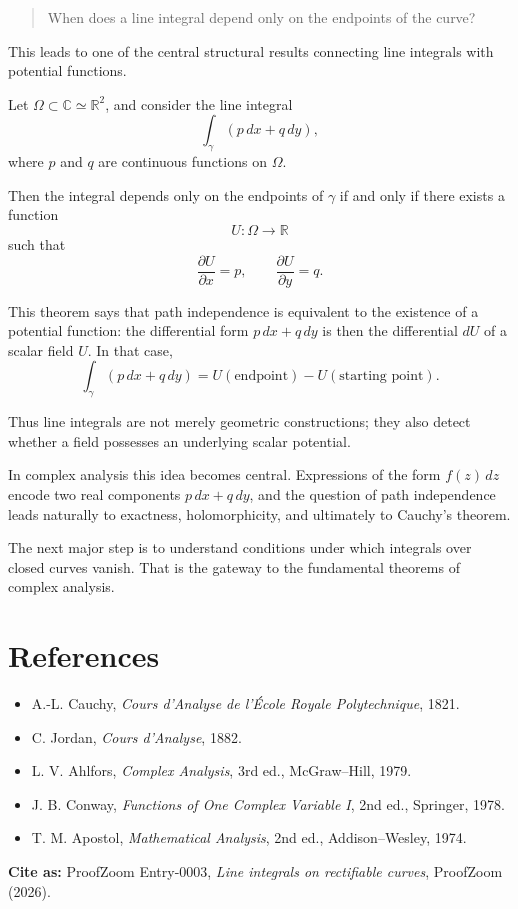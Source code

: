 \documentclass{article}
\begin{document}
\begin{quote}
When does a line integral depend only on the endpoints of the curve?
\end{quote}

This leads to one of the central structural results connecting line integrals with potential functions.

\begin{theorem}
Let \(\Omega \subset \mathbb{C} \simeq \mathbb{R}^2\), and consider the line integral
\[
\int_\gamma (p\,dx+q\,dy),
\]
where \(p\) and \(q\) are continuous functions on \(\Omega\).

Then the integral depends only on the endpoints of \(\gamma\) if and only if there exists a function
\[
U:\Omega\to\mathbb{R}
\]
such that
\[
\frac{\partial U}{\partial x}=p,
\qquad
\frac{\partial U}{\partial y}=q.
\]
\end{theorem}

This theorem says that path independence is equivalent to the existence of a potential function: the differential form \(p\,dx+q\,dy\) is then the differential \(dU\) of a scalar field \(U\). In that case,
\[
\int_\gamma (p\,dx+q\,dy)
=
U(\text{endpoint})-U(\text{starting point}).
\]

Thus line integrals are not merely geometric constructions; they also detect whether a field possesses an underlying scalar potential.

In complex analysis this idea becomes central. Expressions of the form \(f(z)\,dz\) encode two real components \(p\,dx+q\,dy\), and the question of path independence leads naturally to exactness, holomorphicity, and ultimately to Cauchy's theorem.

The next major step is to understand conditions under which integrals over closed curves vanish. That is the gateway to the fundamental theorems of complex analysis.
\section*{References}

\begin{itemize}

\item A.-L. Cauchy, \emph{Cours d’Analyse de l’École Royale Polytechnique}, 1821.

\item C. Jordan, \emph{Cours d’Analyse}, 1882.

\item L. V. Ahlfors, \emph{Complex Analysis}, 3rd ed., McGraw–Hill, 1979.

\item J. B. Conway, \emph{Functions of One Complex Variable I}, 2nd ed., Springer, 1978.

\item T. M. Apostol, \emph{Mathematical Analysis}, 2nd ed., Addison–Wesley, 1974.

\end{itemize}

\bigskip
\noindent\textbf{Cite as:} ProofZoom Entry-0003, \emph{Line integrals on rectifiable curves}, ProofZoom (2026).
\end{document}
